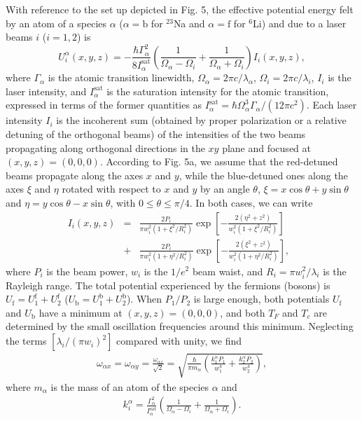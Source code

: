 \documentclass[pra,letterpaper,twocolumn,showpacs,superscriptaddress]{revtex4}
\begin{document}
With reference to the set up depicted in Fig. 5, the effective potential energy felt by an atom of a species $\alpha$ ($\alpha=\mathrm{b}$ 
for $^{23}$Na and $\alpha=\mathrm{f}$ for $^{6}$Li) and due to a laser beams $i$ ($i=1,2$) is \cite{Ashkin1979}
\begin{equation}
U_{i}^{\alpha}(x,y,z)=-\frac{\hbar \Gamma_{\alpha}^2}{8 I_{\alpha}^\mathrm{sat}}
\left( \frac{1}{\Omega_\alpha - \Omega_i} +\frac{1}{\Omega_\alpha + \Omega_i} \right)  I_i(x,y,z),
\end{equation}
where $\Gamma_{\alpha}$ is the atomic transition linewidth, $\Omega_\alpha=2 \pi c/\lambda_{\alpha}$, $\Omega_i=2 \pi c/\lambda_i$, 
$I_i$ is the laser intensity, and $I_{\alpha}^\mathrm{sat}$ is the saturation intensity for the atomic transition, expressed in terms of the former 
quantities as $I_{\alpha}^\mathrm{sat}=\hbar \Omega_\alpha^3 \Gamma_\alpha/(12 \pi c^2)$.
Each laser intensity $I_i$ is the incoherent sum (obtained by proper polarization or a relative detuning of the orthogonal beams) of the 
intensities of the two beams propagating along orthogonal directions in the $xy$ plane and focused at $(x,y,z)=(0,0,0)$.
According to Fig. 5a, we assume that the red-detuned beams propagate along the axes $x$ and $y$, while the blue-detuned 
ones along the axes $\xi$ and $\eta$ rotated with respect to $x$ and $y$ by an angle $\theta$, $\xi=x\cos\theta + y\sin\theta$ 
and $\eta=y\cos\theta - x\sin\theta$, with $0\leq \theta \leq \pi/4$. In both cases, we can write 
\begin{eqnarray}
I_i(x,y,z) &=& 
\frac{2 P_i}{\pi w_i^2 \left(1+{\xi^2}/{R_i^2}\right)}
\exp\left[
-\frac{2(\eta^2+z^2)}{w_i^2 \left(1+{\xi^2}/{R_i^2}\right)}\right]
\nonumber \\
&+&
\frac{2 P_i}{\pi w_i^2 \left(1+{\eta^2}/{R_i^2}\right)}
\exp\left[
-\frac{2(\xi^2+z^2)}{w_i^2 \left(1+{\eta^2}/{R_i^2}\right)}\right],~~~
\end{eqnarray}
where $P_i$ is the beam power, $w_i$ is the $1/e^2$ beam waist, and $R_i=\pi w_i^2/\lambda_i$ is the Rayleigh range.
The total potential experienced by the fermions (bosons) is $U_\mathrm{f}=U_1^\mathrm{f}+U_2^\mathrm{f}$ 
($U_\mathrm{b}=U_1^\mathrm{b}+U_2^\mathrm{b}$). When $P_1/P_2$ is large enough, both potentials 
$U_\mathrm{f}$ and $U_\mathrm{b}$ have a minimum at $(x,y,z)=(0,0,0)$, and both $T_F$ and $T_c$ are 
determined by the small oscillation frequencies around this minimum.
Neglecting the terms $[\lambda_i/(\pi w_i)^2]$ compared with unity, we find
\begin{eqnarray}
\omega_{\alpha x} = \omega_{\alpha y} = \frac{\omega_{\alpha z}}{\sqrt{2}} = \sqrt{\frac{\hbar}{\pi m_\alpha}
\left(\frac{k_1^\alpha P_1}{w_1^4}+\frac{k_2^\alpha P_2}{w_2^4}\right)},
\label{omega}
\end{eqnarray}
where $m_\alpha$ is the mass of an atom of the species $\alpha$ and
\begin{eqnarray}
k_{i}^{\alpha} = \frac{\Gamma_{\alpha}^2}{I_{\alpha}^\mathrm{sat}}
\left( \frac{1}{\Omega_\alpha - \Omega_i} +\frac{1}{\Omega_\alpha + \Omega_i} \right).
\end{eqnarray}
\end{document}
